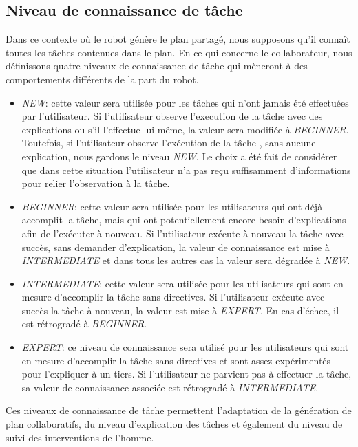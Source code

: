 \documentclass[a4paper,11pt,twoside]{StyleThese}
\begin{document}
\subsection{Niveau de connaissance de tâche}

Dans ce contexte où le robot génère le plan partagé, nous supposons qu'il connaît toutes les tâches contenues dans le plan.
En ce qui concerne le collaborateur, nous définissons quatre niveaux de connaissance de tâche qui mèneront à des comportements différents de la part du robot.

\begin{itemize}
\item \textit{NEW}: cette valeur sera utilisée pour les tâches qui n'ont jamais été effectuées par l'utilisateur. Si l'utilisateur observe l'execution de la tâche avec des explications ou s'il l'effectue lui-même, la valeur sera modifiée à \textit{BEGINNER}.
Toutefois, si l'utilisateur observe l'exécution de la tâche , sans aucune explication, nous gardons le niveau \textit{NEW}. Le choix a été fait de considérer que dans cette situation l'utilisateur n'a pas reçu suffisamment d'informations pour relier l'observation à la tâche.
\item \textit{BEGINNER}: cette valeur sera utilisée pour les utilisateurs qui ont déjà accomplit la tâche, mais qui ont potentiellement encore besoin d'explications afin de l'exécuter à nouveau. Si l'utilisateur exécute à nouveau la tâche avec succès, sans demander d'explication, la valeur de connaissance est mise à \textit{INTERMEDIATE} et dans tous les autres cas la valeur sera dégradée à \textit{NEW}.
\item \textit{INTERMEDIATE}: cette valeur sera utilisée pour les utilisateurs qui sont en mesure d'accomplir la tâche sans directives. Si l'utilisateur exécute avec succès la tâche à nouveau, la valeur est mise à \textit{EXPERT}. En cas d'échec, il est rétrogradé à \textit{BEGINNER}.
\item \textit{EXPERT}: ce niveau de connaissance sera utilisé pour les utilisateurs qui sont en mesure d'accomplir la tâche sans directives et sont assez expérimentés pour l'expliquer à un tiers. Si l'utilisateur ne parvient pas à effectuer la tâche, sa valeur de connaissance associée est rétrogradé à \textit{INTERMEDIATE}.
\end{itemize}

Ces niveaux de connaissance de tâche permettent l'adaptation de la génération de plan collaboratifs, du niveau d'explication des tâches et également du niveau de suivi des interventions de l'homme.
\end{document}
